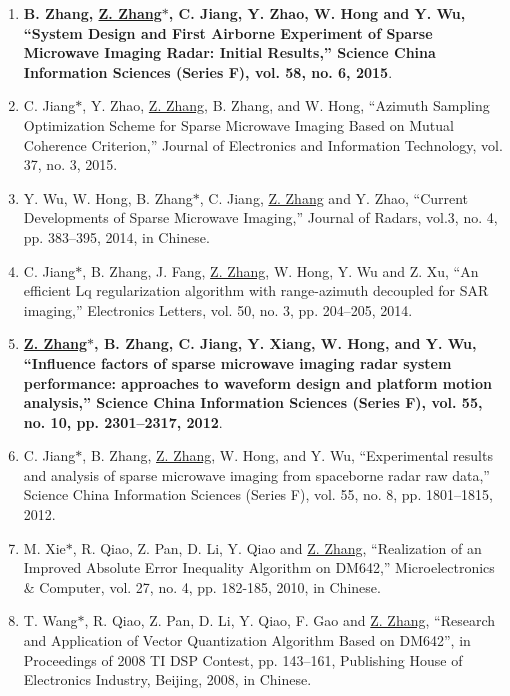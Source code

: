 \documentclass[paper=a4,fontsize=11pt]{scrartcl}
\begin{document}
\begin{enumerate}
\item \textbf{B. Zhang, \underline{Z. Zhang$\ast$}, C. Jiang, Y. Zhao, W. Hong and Y. Wu, ``System Design and First Airborne Experiment of Sparse Microwave Imaging Radar: Initial Results,'' Science China Information Sciences (Series F), vol. 58, no. 6, 2015}.

\item C. Jiang$\ast$, Y. Zhao, \underline{Z. Zhang}, B. Zhang, and W. Hong, ``Azimuth Sampling Optimization Scheme for Sparse Microwave Imaging Based on Mutual Coherence Criterion,'' Journal of Electronics and Information Technology, vol. 37, no. 3, 2015.

\item Y. Wu, W. Hong, B. Zhang$\ast$, C. Jiang, \underline{Z. Zhang} and Y. Zhao, ``Current Developments of Sparse Microwave Imaging,'' Journal of Radars, vol.3, no. 4, pp. 383--395, 2014, in Chinese.

\item C. Jiang$\ast$, B. Zhang, J. Fang, \underline{Z. Zhang}, W. Hong, Y. Wu and Z. Xu, ``An efficient Lq regularization algorithm with range-azimuth decoupled for SAR imaging,'' Electronics Letters, vol. 50, no. 3, pp. 204--205, 2014.

\item \textbf{\underline{Z. Zhang$\ast$}, B. Zhang, C. Jiang, Y. Xiang, W. Hong, and Y. Wu, ``Influence factors of sparse microwave imaging radar system performance: approaches to waveform design and platform motion analysis,'' Science China Information Sciences (Series F), vol. 55, no. 10, pp. 2301--2317, 2012}.

\item C. Jiang$\ast$, B. Zhang, \underline{Z. Zhang}, W. Hong, and Y. Wu, ``Experimental results and analysis of sparse microwave imaging from spaceborne radar raw data,'' Science China Information Sciences (Series F), vol. 55, no. 8, pp. 1801--1815, 2012.


\item M. Xie$\ast$, R. Qiao, Z. Pan, D. Li, Y. Qiao and \underline{Z. Zhang}, ``Realization of an Improved Absolute Error Inequality Algorithm on DM642,'' Microelectronics \& Computer, vol. 27, no. 4, pp. 182-185, 2010, in Chinese.

\item T. Wang$\ast$, R. Qiao, Z. Pan, D. Li, Y. Qiao, F. Gao and \underline{Z. Zhang}, ``Research and Application of Vector Quantization Algorithm Based on DM642'', in Proceedings of 2008 TI DSP Contest, pp. 143--161, Publishing House of Electronics Industry, Beijing, 2008, in Chinese. 

~\\

\end{enumerate}
\end{document}
